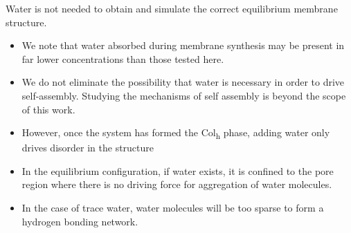 \documentclass{article}
\begin{document}
  Water is not needed to obtain and simulate the correct equilibrium 
  membrane structure.
  \begin{itemize}
	\item We note that water absorbed during membrane synthesis may
        be present in far lower concentrations than those 
        tested here.
	\item We do not eliminate the possibility that water is necessary
        in order to drive self-assembly. Studying the mechanisms of self assembly is
	beyond the scope of this work.
	\item However, once the system has formed the Col\textsubscript{h} 
	phase, adding water only drives disorder in the structure
	\item In the equilibrium configuration, if water exists, it is confined
	to the pore region where there is no driving force for aggregation of 
	water molecules. 
	\item In the case of trace water, water molecules will be too sparse to
	form a hydrogen bonding network.
  \end{itemize}


 
\end{document}
